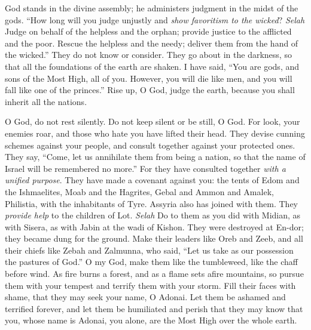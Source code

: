 \begin{biblechapter} %
 God stands in the divine assembly; 
he administers judgment in the midst of the gods.
\verse “How long will you judge unjustly 
and \textit{show favoritism to the wicked}? \textit{Selah}
\verse Judge on behalf of the helpless and the orphan; 
provide justice to the afflicted and the poor.
\verse Rescue the helpless and the needy; 
deliver them from the hand of the wicked.”
\verse They do not know or consider. 
They go about in the darkness, 
so that all the foundations of the earth are shaken.
\verse I have said, “You are gods, 
and sons of the Most High, all of you.
\verse However, you will die like men, 
and you will fall like one of the princes.”
\verse Rise up, O God, judge the earth, 
because you shall inherit all the nations.
\end{biblechapter}

\begin{biblechapter} %
 O God, do not rest silently. 
Do not keep silent or be still, O God.
\verse For look, your enemies roar, 
and those who hate you have lifted their head.
\verse They devise cunning schemes against your people, 
and consult together against your protected ones.
\verse They say, “Come, let us annihilate them from being a nation, 
so that the name of Israel will be remembered no more.”
\verse For they have consulted together \textit{with a unified purpose}. 
They have made a covenant against you:
\verse the tents of Edom and the Ishmaelites, 
Moab and the Hagrites,
\verse Gebal and Ammon and Amalek, 
Philistia, with the inhabitants of Tyre.
\verse Assyria also has joined with them. 
They \textit{provide help} to the children of Lot. \textit{Selah}
\verse Do to them as you did with Midian, 
as with Sisera, as with Jabin at the wadi of Kishon.
\verse They were destroyed at En-dor; 
they became dung for the ground.
\verse Make their leaders like Oreb and Zeeb, 
and all their chiefs like Zebah and Zalmunna,
\verse who said, “Let us take as our possession 
the pastures of God.”
\verse O my God, make them like the tumbleweed, 
like the chaff before wind.
\verse As fire burns a forest, 
and as a flame sets afire mountains,
\verse so pursue them with your tempest 
and terrify them with your storm.
\verse Fill their faces with shame, 
that they may seek your name, O Adonai.
\verse Let them be ashamed and terrified forever, 
and let them be humiliated and perish
\verse that they may know that you, 
whose name is Adonai, you alone, 
are the Most High over the whole earth.
\end{biblechapter}

